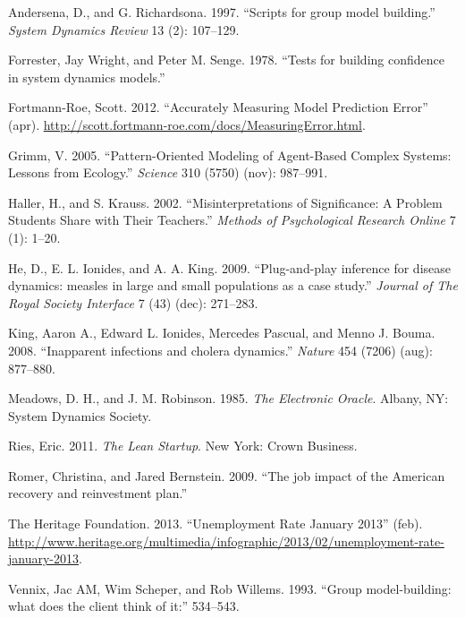 \documentclass[]{memoir}
\begin{document}
Andersena, D., and G. Richardsona. 1997. ``Scripts for group model
building.'' \emph{System Dynamics Review} 13 (2): 107--129.

Forrester, Jay Wright, and Peter M. Senge. 1978. ``Tests for building
confidence in system dynamics models.''

Fortmann-Roe, Scott. 2012. ``Accurately Measuring Model Prediction
Error'' (apr).
\url{http://scott.fortmann-roe.com/docs/MeasuringError.html}.

Grimm, V. 2005. ``Pattern-Oriented Modeling of Agent-Based Complex
Systems: Lessons from Ecology.'' \emph{Science} 310 (5750) (nov):
987--991.

Haller, H., and S. Krauss. 2002. ``Misinterpretations of Significance: A
Problem Students Share with Their Teachers.'' \emph{Methods of
Psychological Research Online} 7 (1): 1--20.

He, D., E. L. Ionides, and A. A. King. 2009. ``Plug-and-play inference
for disease dynamics: measles in large and small populations as a case
study.'' \emph{Journal of The Royal Society Interface} 7 (43) (dec):
271--283.

King, Aaron A., Edward L. Ionides, Mercedes Pascual, and Menno J. Bouma.
2008. ``Inapparent infections and cholera dynamics.'' \emph{Nature} 454
(7206) (aug): 877--880.

Meadows, D. H., and J. M. Robinson. 1985. \emph{The Electronic Oracle}.
Albany, NY: System Dynamics Society.

Ries, Eric. 2011. \emph{The Lean Startup}. New York: Crown Business.

Romer, Christina, and Jared Bernstein. 2009. ``The job impact of the
American recovery and reinvestment plan.''

The Heritage Foundation. 2013. ``Unemployment Rate January 2013'' (feb).
\url{http://www.heritage.org/multimedia/infographic/2013/02/unemployment-rate-january-2013}.

Vennix, Jac AM, Wim Scheper, and Rob Willems. 1993. ``Group
model-building: what does the client think of it:'' 534--543.
\end{document}
